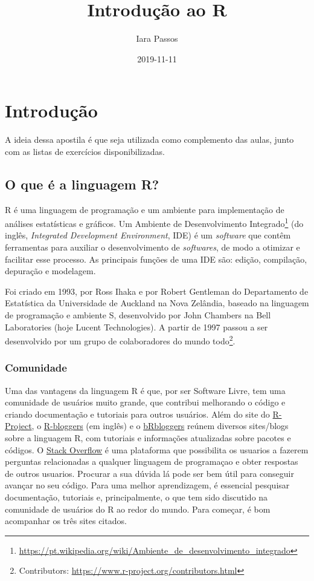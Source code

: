 \documentclass[]{book}
\title{Introdução ao R}
\author{Iara Passos}
\date{2019-11-11}
\let\rmarkdownfootnote\footnote%
\def\footnote{\protect\rmarkdownfootnote}
\theoremstyle{definition}
\theoremstyle{definition}
\theoremstyle{definition}
\theoremstyle{remark}
\begin{document}
\maketitle

{
\setcounter{tocdepth}{1}
\tableofcontents
}
\hypertarget{intro}{%
\chapter{Introdução}\label{intro}}

A ideia dessa apostila é que seja utilizada como complemento das aulas, junto com as listas de exercícios disponibilizadas.

\hypertarget{o-que-uxe9-a-linguagem-r}{%
\section{O que é a linguagem R?}\label{o-que-uxe9-a-linguagem-r}}

R é uma linguagem de programação e um ambiente para implementação de análises estatísticas e gráficos. Um Ambiente de Desenvolvimento Integrado\footnote{\url{https://pt.wikipedia.org/wiki/Ambiente_de_desenvolvimento_integrado}} (do inglês, \emph{Integrated Development Environment}, IDE) é um \emph{software} que contêm ferramentas para auxiliar o desenvolvimento de \emph{softwares}, de modo a otimizar e facilitar esse processo. As principais funções de uma IDE são: edição, compilação, depuração e modelagem.

Foi criado em 1993, por Ross Ihaka e por Robert Gentleman do Departamento de Estatística da Universidade de Auckland na Nova Zelândia, baseado na linguagem de programação e ambiente S, desenvolvido por John Chambers na Bell Laboratories (hoje Lucent Technologies). A partir de 1997 passou a ser desenvolvido por um grupo de colaboradores do mundo todo\footnote{Contributors: \url{https://www.r-project.org/contributors.html}}.

\hypertarget{comunidade}{%
\subsection{Comunidade}\label{comunidade}}

Uma das vantagens da linguagem R é que, por ser Software Livre, tem uma comunidade de usuários muito grande, que contribui melhorando o código e criando documentação e tutoriais para outros usuários. Além do site do \href{https://www.r-project.org/}{R-Project}, o \href{https://www.r-bloggers.com/}{R-bloggers} (em inglês) e o \href{https://brbloggers.com.br/}{bRbloggers} reúnem diversos sites/blogs sobre a linguagem R, com tutoriais e informações atualizadas sobre pacotes e códigos. O \href{https://stackoverflow.com/questions/tagged/r}{Stack Overflow} é uma plataforma que possibilita os usuarios a fazerem perguntas relacionadas a qualquer linguagem de programaçao e obter respostas de outros usuarios. Procurar a sua dúvida lá pode ser bem útil para conseguir avançar no seu código. Para uma melhor aprendizagem, é essencial pesquisar documentação, tutoriais e, principalmente, o que tem sido discutido na comunidade de usuários do R ao redor do mundo. Para começar, é bom acompanhar os três sites citados.
\end{document}
